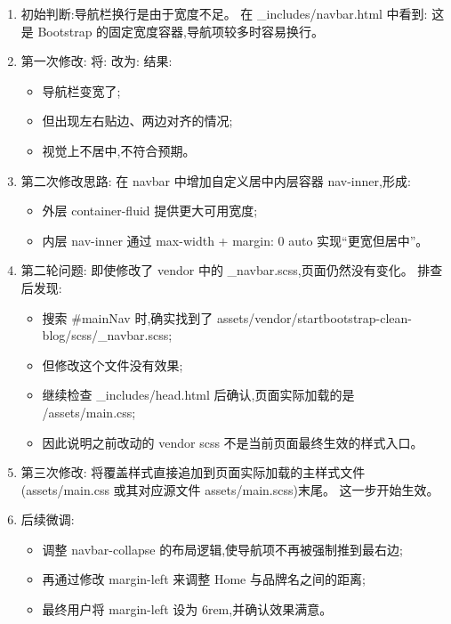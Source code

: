 \documentclass[lang=cn,scheme=chinese,color=blue,device=normal,toc=onecol,math=cm]{elegantbook}
\begin{document}
\begin{enumerate}
\item 初始判断:导航栏换行是由于宽度不足。 在 \_\allowbreak{}includes/\allowbreak{}navbar.html 中看到:  这是 Bootstrap 的固定宽度容器,导航项较多时容易换行。
\item 第一次修改: 将:  改为:  结果:  
\begin{itemize}
\item 导航栏变宽了;
\item 但出现左右贴边、两边对齐的情况;
\item 视觉上不居中,不符合预期。
\end{itemize}
\item 第二次修改思路: 在 navbar 中增加自定义居中内层容器 nav-inner,形成: 
\begin{itemize}
\item 外层 container-fluid 提供更大可用宽度;
\item 内层 nav-inner 通过 max-width + margin: 0 auto 实现“更宽但居中”。
\end{itemize}
\item 第二轮问题: 即使修改了 vendor 中的 \_\allowbreak{}navbar.scss,页面仍然没有变化。 排查后发现: 
\begin{itemize}
\item 搜索 \#mainNav 时,确实找到了 assets/\allowbreak{}vendor/\allowbreak{}startbootstrap-clean-blog/\allowbreak{}scss/\allowbreak{}\_\allowbreak{}navbar.scss;
\item 但修改这个文件没有效果;
\item 继续检查 \_\allowbreak{}includes/\allowbreak{}head.html 后确认,页面实际加载的是 /\allowbreak{}assets/\allowbreak{}main.css;
\item 因此说明之前改动的 vendor scss 不是当前页面最终生效的样式入口。
\end{itemize}
\item 第三次修改: 将覆盖样式直接追加到页面实际加载的主样式文件(assets/\allowbreak{}main.css 或其对应源文件 assets/\allowbreak{}main.scss)末尾。 这一步开始生效。\par
\item 后续微调: 
\begin{itemize}
\item 调整 navbar-collapse 的布局逻辑,使导航项不再被强制推到最右边;
\item 再通过修改 margin-left 来调整 Home 与品牌名之间的距离;
\item 最终用户将 margin-left 设为 6rem,并确认效果满意。
\end{itemize}
\end{enumerate}
\end{document}
